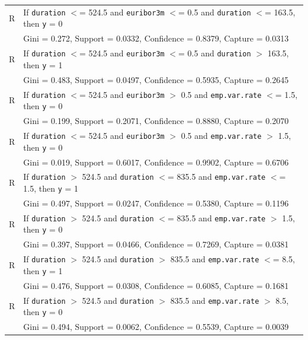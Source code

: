 \documentclass[11pt,a4paper]{article}
\newcounter{magicrownumbers}
\begin{document}
    \setcounter{magicrownumbers}{0}
    \newcommand\rules{\stepcounter{magicrownumbers}\arabic{magicrownumbers}}
    \begin{tabular}{r l}
        R\rules & If \texttt{duration} $<$= 524.5 and \texttt{euribor3m} $<$= 0.5 and \texttt{duration} $<$= 163.5, then \texttt{y} = 0 \\
        & Gini = 0.272, Support = 0.0332, Confidence = 0.8379, Capture = 0.0313 \\
        
        R\rules & If \texttt{duration} $<$= 524.5 and \texttt{euribor3m} $<$= 0.5 and \texttt{duration} $>$ 163.5, then \texttt{y} = 1 \\
        & Gini = 0.483, Support = 0.0497, Confidence = 0.5935, Capture = 0.2645 \\
        
        R\rules & If \texttt{duration} $<$= 524.5 and \texttt{euribor3m} $>$ 0.5 and \texttt{emp.var.rate} $<$= 1.5, then \texttt{y} = 0 \\
        & Gini = 0.199, Support = 0.2071, Confidence = 0.8880, Capture = 0.2070 \\
        
        R\rules & If \texttt{duration} $<$= 524.5 and \texttt{euribor3m} $>$ 0.5 and \texttt{emp.var.rate} $>$ 1.5, then \texttt{y} = 0 \\
        & Gini = 0.019, Support = 0.6017, Confidence = 0.9902, Capture = 0.6706\\
        
        R\rules & If \texttt{duration} $>$ 524.5 and \texttt{duration} $<$= 835.5 and \texttt{emp.var.rate} $<$= 1.5, then \texttt{y} = 1 \\
        & Gini = 0.497, Support = 0.0247, Confidence = 0.5380, Capture = 0.1196 \\
        
        R\rules & If \texttt{duration} $>$ 524.5 and \texttt{duration} $<$= 835.5 and \texttt{emp.var.rate} $>$ 1.5, then \texttt{y} = 0 \\
        & Gini = 0.397, Support = 0.0466, Confidence = 0.7269, Capture = 0.0381 \\
        
        R\rules & If \texttt{duration} $>$ 524.5 and \texttt{duration} $>$ 835.5 and \texttt{emp.var.rate} $<$= 8.5, then \texttt{y} = 1 \\
        & Gini = 0.476, Support = 0.0308, Confidence = 0.6085, Capture = 0.1681 \\
        
        R\rules & If \texttt{duration} $>$ 524.5 and \texttt{duration} $>$ 835.5 and \texttt{emp.var.rate} $>$ 8.5, then \texttt{y} = 0 \\
        & Gini = 0.494, Support = 0.0062, Confidence = 0.5539, Capture = 0.0039 \\
        
    \end{tabular} \\ \\
\end{document}
